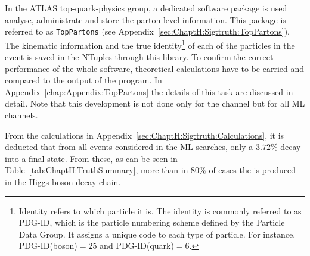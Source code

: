 In the ATLAS top-quark-physics group, a dedicated software package 
is used analyse, administrate and store the parton-level information. 
This package is referred to as \texttt{TopPartons} (see Appendix~\ref{sec:ChaptH:Sig:truth:TopPartons}). %
The kinematic information and the 
true identity\footnote{Identity refers to which particle it is.
 The identity is commonly referred to as PDG-ID, which is the particle 
 numbering scheme defined by the Particle Data Group. 
It assigns a unique code to each type of particle. 
For instance, PDG-ID(\PHiggs boson)$ = 25$ 
and PDG-ID(\Ptop quark)$ = 6$.} of each of the particles 
in the event is saved in the NTuples through this library. %
To confirm the correct performance of the whole software, 
theoretical calculations have to be carried and compared
to the output of the program.    
In Appendix~\ref{chap:Appendix:TopPartons} the details of this task are discussed
in detail. %
Note that this development is not done only
for the \dileptau channel but for all ML channels. 

From the calculations in Appendix~\ref{sec:ChaptH:Sig:truth:Calculations}, it
is deducted that from all \tHq events considered in the ML searches,
only a $3.72\%$ decay into a \dileptau final state. %
From these, as can be seen in Table~\ref{tab:ChaptH:TruthSummary}, 
more than in 80\% of cases the \tauhad is produced in
the Higgs-boson-decay chain. 

